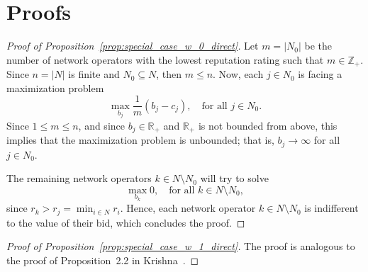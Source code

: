 \section{Proofs} %
\label{sec:proofs_direct}
\begin{proof}[Proof of Proposition~\ref{prop:special_case_w_0_direct}]
Let $m = |N_0|$ be the number of network operators with the lowest reputation rating such that $m\in\mathbb{Z}_+$. Since $n = |N|$ is finite and $N_0\subseteq N$, then $m \le n$. Now, each $j\in N_0$ is facing a maximization problem
\begin{equation*}
	\max_{b_j} \frac{1}{m} \left(b_j - c_j \right), \quad\text{for all } j\in N_0.
\end{equation*}
Since $1\le m\le n$, and since $b_j\in\mathbb{R}_+$ and $\mathbb{R}_+$ is not bounded from above, this implies that the maximization problem is unbounded; that is, $b_j\rightarrow\infty$ for all $j\in N_0$.

The remaining network operators $k\in N\setminus N_0$ will try to solve
\begin{equation*}
	\max_{b_k} 0, \quad\text{for all } k\in N\setminus N_0,
\end{equation*}
since $r_k > r_j = \min_{i\in N} r_i$. Hence, each network operator $k\in N\setminus N_0$ is indifferent to the value of their bid, which concludes the proof.
\end{proof}

\begin{proof}[Proof of Proposition~\ref{prop:special_case_w_1_direct}]
The proof is analogous to the proof of Proposition~2.2 in Krishna~\cite{Krishna10}.
\end{proof}

